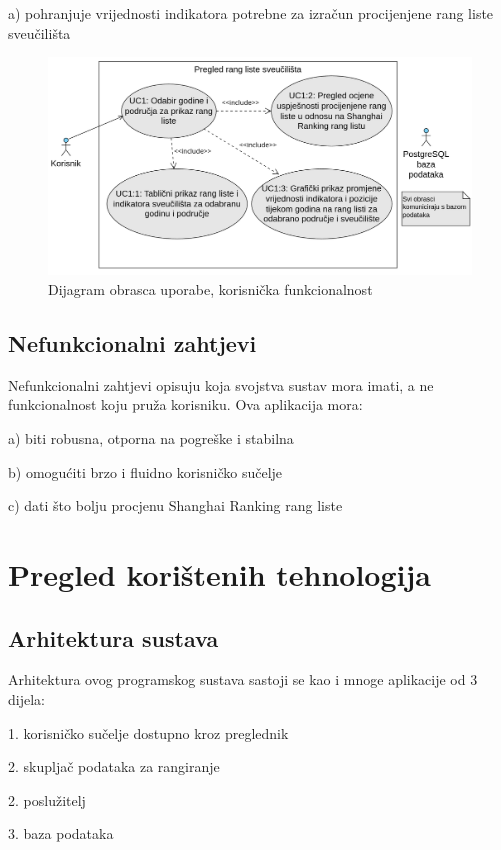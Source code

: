 \documentclass[times, utf8, zavrsni]{fer}
\begin{document}
a) pohranjuje vrijednosti indikatora potrebne za izračun procijenjene rang liste sveučilišta
\\
\begin{figure}[htb]
    \hspace*{-2cm}
    \includegraphics[scale=0.4]{slika1.png}
    \caption{Dijagram obrasca uporabe, korisnička funkcionalnost}
    \label{fig:korisnik}
    \end{figure}
\newpage
\section{Nefunkcionalni zahtjevi}
Nefunkcionalni zahtjevi opisuju koja svojstva sustav mora imati, a ne funkcionalnost koju pruža korisniku. Ova aplikacija mora:

a) biti robusna, otporna na pogreške i stabilna

b) omogućiti brzo i fluidno korisničko sučelje

c) dati što bolju procjenu Shanghai Ranking rang liste

\chapter{Pregled korištenih tehnologija}
\section{Arhitektura sustava}
\label{arhitektura}
Arhitektura ovog programskog sustava sastoji se kao i mnoge aplikacije od 3 dijela:

1. korisničko sučelje dostupno kroz preglednik

2. skupljač podataka za rangiranje

2. poslužitelj

3. baza podataka
\end{document}
